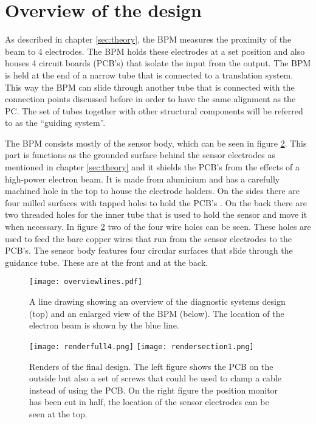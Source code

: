 \section{Overview of the design}
As described in chapter \ref{sec:theory}, the BPM measures the proximity of the beam to 4 electrodes. The BPM holds these electrodes at a set position and also houses 4 circuit boards (PCB's) that isolate the input from the output. The BPM is held at the end of a narrow tube that is connected to a translation system. This way the BPM can slide through another tube that is connected with the connection points discussed before in order to have the same alignment as the PC. The set of tubes together with other structural components will be referred to as the ``guiding system''.

The BPM consists mostly of the sensor body, which can be seen in figure \ref{fig:designfinal}. This part is functions as the grounded surface behind the sensor electrodes as mentioned in chapter \ref{sec:theory} and it shields the PCB's from the effects of a high-power electron beam.
It is made from aluminium and has a carefully machined hole in the top to house the electrode holders. On the sides there are four milled surfaces with tapped holes to hold the PCB's . On the back there are two threaded holes for the inner tube that is used to hold the sensor and move it when necessary. 
In figure \ref{fig:designfinal} two of the four wire holes can be seen. These holes are used to feed the bare copper wires that run from the sensor electrodes to the PCB's.
The sensor body features four circular surfaces that slide through the guidance tube. These are at the front and at the back.

\begin{figure}[h]
 \centering
 \texttt{[image: overviewlines.pdf]}
 \caption{A line drawing showing an overview of the diagnostic systems design (top) and an enlarged view of the BPM (below). The location of the electron beam is shown by the blue line.}
 \label{fig:designoverview}
\end{figure}

\begin{figure}[h]
  \centering
  \texttt{[image: renderfull4.png]}
  \texttt{[image: rendersection1.png]}
  \caption{ Renders of the final design. The left figure shows the PCB on the outside but also a set of screws that could be used to clamp a cable instead of using the PCB. On the right figure the position monitor has been cut in half, the location of the sensor electrodes can be seen at the top.}
  \label{fig:designfinal}
\end{figure}


